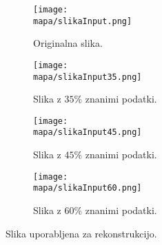 \renewcommand{\mapa}{Poglavja/Slike/grayscale1000}

\begin{figure}[!ht]
    \centering
    \begin{subfigure}{0.49\linewidth}
        \texttt{[image: \\mapa/slikaInput.png]}
        \caption{Originalna slika.}
    \end{subfigure}
    \hfill
    \begin{subfigure}{0.49\linewidth}
        \texttt{[image: \\mapa/slikaInput35.png]}
        \caption{Slika z $35\%$ znanimi podatki.}
    \end{subfigure}
    \begin{subfigure}{0.49\linewidth}
        \texttt{[image: \\mapa/slikaInput45.png]}
        \caption{Slika z $45\%$ znanimi podatki.}
    \end{subfigure}
    \hfill
    \begin{subfigure}{0.49\linewidth}
        \texttt{[image: \\mapa/slikaInput60.png]}
        \caption{Slika z $60\%$ znanimi podatki.}
    \end{subfigure}
    \caption{Slika uporabljena za rekonstrukcijo. \cite{UnsplashGora}}
\end{figure}

